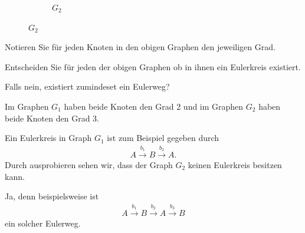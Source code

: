 \begin{myexercise}
\begin{figure}[H]
\begin{subfigure}[b]{0.4\textwidth}
{
			}%
			\caption*{$G_2$}
		\end{subfigure}
	\end{figure}
	\begin{aenum}
		\item Notieren Sie für jeden Knoten in den obigen Graphen den jeweiligen Grad.
		\item Entscheiden Sie für jeden der obigen Graphen ob in ihnen ein Eulerkreis existiert.
		\item Falls nein, existiert zumindeset ein Eulerweg?
	\end{aenum}
	\begin{myanswer}\label{myexercise:04-sol}
		\begin{aenum}
			\item Im Graphen $G_1$ haben beide Knoten den Grad 2 und im Graphen $G_2$ haben beide Knoten den Grad 3.
			\item Ein Eulerkreis in Graph $G_1$ ist zum Beispiel gegeben durch
			\begin{align*}
				A \stackrel{b_1}{\longrightarrow} B \stackrel{b_2}{\longrightarrow} A.
			\end{align*}
			Durch ausprobieren sehen wir, dass der Graph $G_2$ keinen Eulerkreis besitzen kann.
			\item Ja, denn beispielsweise ist
			\begin{align*}
				A \stackrel{b_1}{\longrightarrow} B \stackrel{b_2}{\longrightarrow} A \stackrel{b_3}{\longrightarrow} B
			\end{align*}
			ein solcher Eulerweg.
		\end{aenum}
	\end{myanswer}
\end{myexercise}

